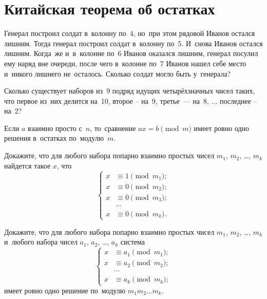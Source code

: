 
\section*{Китайская теорема об остатках}


\begin{problems}

\item
Генерал построил солдат в~колонну по~4, но~при этом рядовой Иванов остался
лишним.
Тогда генерал построил солдат в~колонну по~5.
И~снова Иванов остался лишним.
Когда~же и~в~колонне по~6 Иванов оказался лишним, генерал посулил ему наряд вне
очереди, после чего в~колонне по~7 Иванов нашел себе место и~никого лишнего
не~осталось.
Сколько солдат могло быть у~генерала?

\item
Сколько существует наборов из~9 подряд идущих четырёхзначных чисел таких, что
первое из~них делится на~10, второе -- на~9, третье~--- на~8, ...
последнее -- на~2?

\item
Если $a$ взаимно просто с~$n$, то~сравнение $ax=b\pmod m$ имеет ровно одно
решения в~остатках по~модулю~$m$.

\item
Докажите, что для любого набора попарно взаимно простых чисел
$m_{1}$, $m_{2}$, \ldots, $m_{k}$ найдется такое $x$, что
\[
\left\{ \begin{aligned}
    x & \equiv 1 \pmod{m_{1}}
; \\
    x & \equiv 0 \pmod{m_{2}}
; \\
    x & \equiv 0 \pmod{m_{3}}
; \\ & \cdots \\
    x & \equiv 0 \pmod{m_{k}}
. \end{aligned} \right.
\]

\item
Докажите, что для любого набора попарно взаимно простых чисел
$m_{1}$, $m_{2}$, \ldots, $m_{k}$ и~любого набора чисел
$a_{1}$, $a_{2}$, \ldots, $a_{k}$ система
\[
\left\{ \begin{aligned}
    x & \equiv a_{1} \pmod{m_{1}}
; \\
    x & \equiv a_{2} \pmod{m_{2}}
; \\ & \cdots \\
    x & \equiv a_{k} \pmod{m_{k}}
; \end{aligned} \right.
\]
имеет ровно одно решение по~модулю $m_{1} m_{2} \ldots m_{k}$.


\end{problems}
